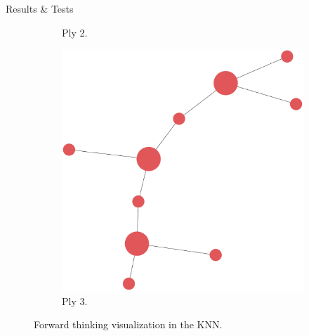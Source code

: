 \documentclass[final]{beamer} %
\begin{document}
\begin{frame}
\begin{columns}
\begin{column}{.33\textwidth}
{\begin{block}{Results \& Tests}
\begin{figure}[!htb]
\begin{subfigure}[!htb]{0.32\columnwidth}
							\caption{Ply 2.}
						\end{subfigure}
						\begin{subfigure}[!htb]{0.32\columnwidth}
							\centering
							\includegraphics[width=\columnwidth]{figures/knn_simple_forward_think_2.pdf}
							\caption{Ply 3.}
						\end{subfigure}
						\caption{Forward thinking visualization in the KNN.}
					\end{figure}
					

\end{block}}
\end{column}
\end{columns}
\end{frame}
\end{document}
